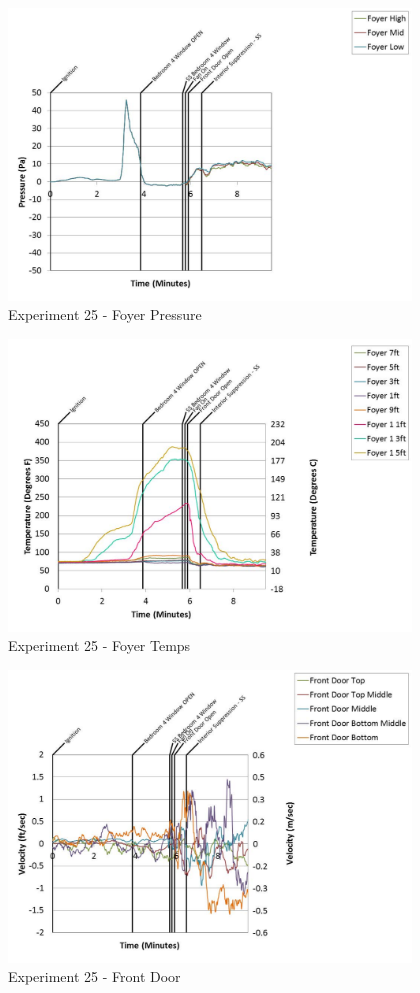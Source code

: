 \documentclass{article}
\begin{document}
\begin{appendices}
	\clearpage

	\begin{figure}[h!]
		\centering
		\includegraphics[height=3.05in]{0_Images/Results_Charts/Exp_25_Charts/FoyerPressure.pdf}
		\caption{Experiment 25 - Foyer Pressure}
	\end{figure}
 

	\begin{figure}[h!]
		\centering
		\includegraphics[height=3.05in]{0_Images/Results_Charts/Exp_25_Charts/FoyerTemps.pdf}
		\caption{Experiment 25 - Foyer Temps}
	\end{figure}
 
	\clearpage

	\begin{figure}[h!]
		\centering
		\includegraphics[height=3.05in]{0_Images/Results_Charts/Exp_25_Charts/FrontDoor.pdf}
		\caption{Experiment 25 - Front Door}
	\end{figure}
 


\end{appendices}
\end{document}
